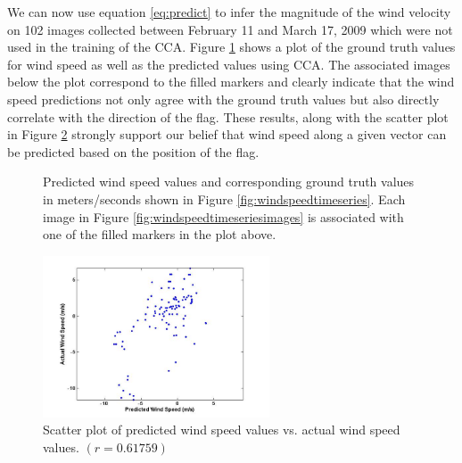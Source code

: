 We can now use equation \ref{eq:predict} to infer the magnitude of the wind velocity on 102 images collected between February 11 and March 17, 2009 which were not used in the training of the CCA. Figure \ref{fig:windpred} shows a plot of the ground truth values for wind speed as well as the predicted values using CCA. The associated images below the plot correspond to the filled markers and clearly indicate that the wind speed predictions not only agree with the ground truth values but also directly correlate with the direction of the flag. These results, along with the scatter plot in Figure \ref{fig:windspeedcorr} strongly support our belief that wind speed along a given vector can be predicted based on the position of the flag.
\begin{figure}
	\centering
	\caption[Predicted wind speed values and corresponding ground truth values in meters/seconds]{Predicted wind speed values and corresponding ground truth values in meters/seconds shown in Figure \ref{fig:windspeedtimeseries}. Each image in Figure \ref{fig:windspeedtimeseriesimages} is associated with one of the filled markers in the plot above.}
	\label{fig:windpred}
\end{figure}
\begin{figure}
	\centering
		\includegraphics[width=0.60\textwidth]{figures/windspeedcorr.jpg}
	\caption[Scatter plot of predicted wind speed values vs. actual wind speed values]{Scatter plot of predicted wind speed values vs. actual wind speed values. $(r=0.61759)$}
	\label{fig:windspeedcorr}
\end{figure}


